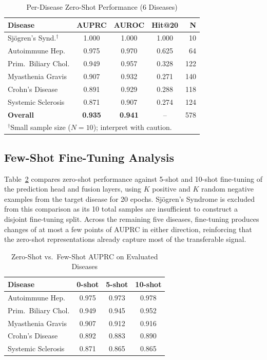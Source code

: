 \documentclass[conference]{IEEEtran}
\begin{document}
\begin{table}[!t]
\caption{Per-Disease Zero-Shot Performance (6 Diseases)}
\label{tab:per_disease}
\centering
\footnotesize
\renewcommand{\arraystretch}{1.4}
\begin{tabular}{p{2.3cm}cccr}
\toprule
\textbf{Disease} & \textbf{AUPRC} & \textbf{AUROC} & \textbf{Hit@20} & \textbf{N} \\
\midrule
Sj\"{o}gren's Synd.$^\dagger$ & 1.000 & 1.000 & 1.000 & 10 \\
Autoimmune Hep. & 0.975 & 0.970 & 0.625 & 64 \\
Prim.\ Biliary Chol. & 0.949 & 0.957 & 0.328 & 122 \\
Myasthenia Gravis & 0.907 & 0.932 & 0.271 & 140 \\
Crohn's Disease & 0.891 & 0.929 & 0.288 & 118 \\
Systemic Sclerosis & 0.871 & 0.907 & 0.274 & 124 \\
\midrule
\textbf{Overall} & \textbf{0.935} & \textbf{0.941} & -- & 578 \\
\bottomrule
\multicolumn{5}{l}{\scriptsize $^\dagger$Small sample size ($N{=}10$); interpret with caution.}
\end{tabular}
\end{table}

\subsection{Few-Shot Fine-Tuning Analysis}

Table~\ref{tab:fewshot} compares zero-shot performance against 5-shot and 10-shot fine-tuning of the prediction head and fusion layers, using $K$ positive and $K$ random negative examples from the target disease for 20 epochs. Sj\"{o}gren's Syndrome is excluded from this comparison as its 10 total samples are insufficient to construct a disjoint fine-tuning split. Across the remaining five diseases, fine-tuning produces changes of at most a few points of AUPRC in either direction, reinforcing that the zero-shot representations already capture most of the transferable signal.

\begin{table}[!t]
\caption{Zero-Shot vs.\ Few-Shot AUPRC on Evaluated Diseases}
\label{tab:fewshot}
\centering
\footnotesize
\renewcommand{\arraystretch}{1.4}
\begin{tabular}{p{2.3cm}ccc}
\toprule
\textbf{Disease} & \textbf{0-shot} & \textbf{5-shot} & \textbf{10-shot} \\
\midrule
Autoimmune Hep. & 0.975 & 0.973 & 0.978 \\
Prim.\ Biliary Chol. & 0.949 & 0.945 & 0.952 \\
Myasthenia Gravis & 0.907 & 0.912 & 0.916 \\
Crohn's Disease & 0.892 & 0.883 & 0.890 \\
Systemic Sclerosis & 0.871 & 0.865 & 0.865 \\
\bottomrule
\end{tabular}
\end{table}
\end{document}
